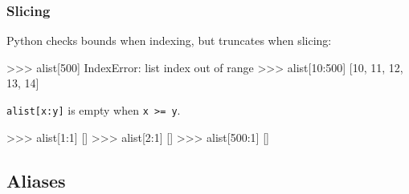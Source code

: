\documentclass[xetex,10pt]{beamer}
\def\spacer{\vspace*{1em}}
\def\pythoni{\lstinline[language=pythontim]}
\begin{document}
\begin{frame}[fragile]
	\frametitle{Slicing}

Python checks bounds when indexing, but truncates when slicing:

\begin{python}
>>> alist[500]
IndexError: list index out of range
>>> alist[10:500]
[10, 11, 12, 13, 14]
\end{python}

	\spacer

\pause
\pythoni{alist[x:y]} is empty when \pythoni{x >= y}.

\begin{python}
>>> alist[1:1]
[]
>>> alist[2:1]
[]
>>> alist[500:1]
[]
\end{python}

\end{frame}

\subsection{Aliases}
\end{document}
